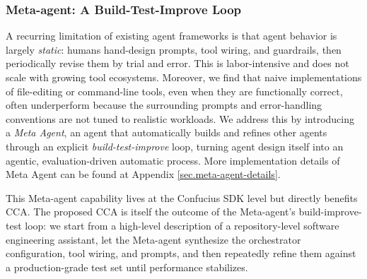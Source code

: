 \subsubsection{Meta-agent: A Build-Test-Improve Loop}
\label{sec.meta_agent}


A recurring limitation of existing agent frameworks is that agent behavior is largely \emph{static}: humans hand-design prompts, tool wiring, and guardrails, then periodically revise them by trial and error. This is labor-intensive and does not scale with growing tool ecosystems. Moreover, we find that naive implementations of file-editing or command-line tools, even when they are functionally correct, often underperform because the surrounding prompts and error-handling conventions are not tuned to realistic workloads. We address this by introducing a \emph{Meta Agent}, an agent that automatically builds and refines other agents through an explicit \emph{build-test-improve} loop, turning agent design itself into an agentic, evaluation-driven automatic process.
More implementation details of Meta Agent can be found at Appendix \ref{sec.meta-agent-details}.

This Meta-agent capability lives at the Confucius SDK level but directly benefits CCA. The proposed CCA is itself the outcome of the Meta-agent's build-improve-test loop: we start from a high-level description of a repository-level software engineering assistant, let the Meta-agent synthesize the orchestrator configuration, tool wiring, and prompts, and then repeatedly refine them against a production-grade test set until performance stabilizes. 

